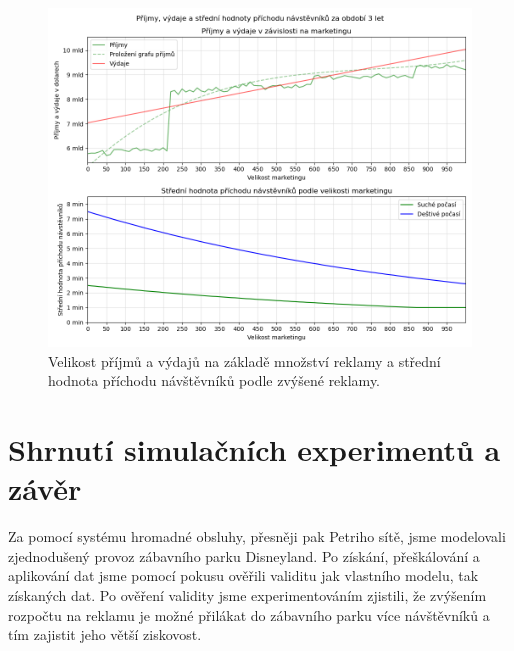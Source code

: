 \begin{figure}[h]
    \centering
    \includegraphics[width=1\textwidth]{obrazky-figures/graph.png}
    \caption{Velikost příjmů a výdajů na základě množství reklamy a střední hodnota příchodu návštěvníků podle zvýšené reklamy.}
    \label{grafy}
\end{figure}
\chapter{Shrnutí simulačních experimentů a závěr}
Za pomocí systému hromadné obsluhy, přesněji pak Petriho sítě, jsme modelovali zjednodušený provoz zábavního parku Disneyland. Po získání, přeškálování a aplikování dat jsme pomocí pokusu ověřili validitu jak vlastního modelu, tak získaných dat. Po ověření validity jsme experimentováním zjistili, že zvýšením rozpočtu na reklamu je možné přilákat do zábavního parku více návštěvníků a tím zajistit jeho větší ziskovost.


%
